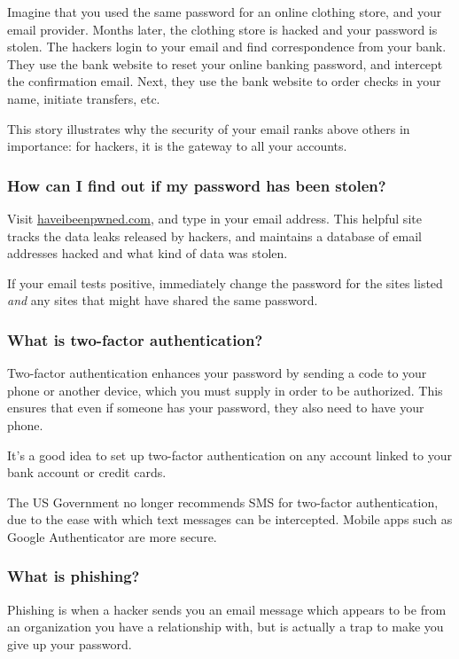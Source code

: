 Imagine that you used the same password for an online clothing store, and your email provider. Months later, the clothing store is hacked and your password is stolen. The hackers login to your email and find correspondence from your bank. They use the bank website to reset your online banking password, and intercept the confirmation email. Next, they use the bank website to order checks in your name, initiate transfers, etc.

This story illustrates why the security of your email ranks above others in importance: for hackers, it is the gateway to all your accounts.

\subsubsection{How can I find out if my password has been stolen?}

Visit \url{haveibeenpwned.com}, and type in your email address. This helpful site tracks the data leaks released by hackers, and maintains a database of email addresses hacked and what kind of data was stolen.

If your email tests positive, immediately change the password for the sites listed \textit{and} any sites that might have shared the same password. 

\subsubsection{What is two-factor authentication?}

Two-factor authentication enhances your password by sending a code to your phone or another device, which you must supply in order to be authorized. This ensures that even if someone has your password, they also need to have your phone.

It's a good idea to set up two-factor authentication on any account linked to your bank account or credit cards.

The US Government no longer recommends SMS for two-factor authentication, due to the ease with which text messages can be intercepted. Mobile apps such as Google Authenticator are more secure.

\subsubsection{What is phishing?}

Phishing is when a hacker sends you an email message which appears to be from an organization you have a relationship with, but is actually a trap to make you give up your password.

